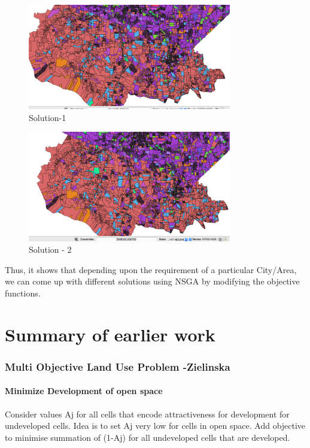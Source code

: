 \documentclass[12pt]{article} %
\begin{document}
\begin{figure}[h]
\begin{center}
\includegraphics[width=3.5in]{Sol1.png}
\caption{Solution-1}
\end{center}
\end{figure}
\begin{figure}[h]
\begin{center}
\includegraphics[width=3.5in]{Sol2.png}
\caption{Solution - 2}
\end{center}
\end{figure}
\newpage
 Thus, it shows that depending upon the requirement of a particular City/Area, we can come up with different solutions using NSGA by modifying the objective functions.
\section{Summary of earlier work}

\subsubsection{Multi Objective Land Use Problem -Zielinska}

\paragraph*{Minimize Development of open space} Consider values Aj  for all cells that encode attractiveness for development for undeveloped cells. Idea is to set Aj very low for cells in open space. Add objective to minimise summation of (1-Aj) for all undeveloped cells that are developed. 
\end{document}
